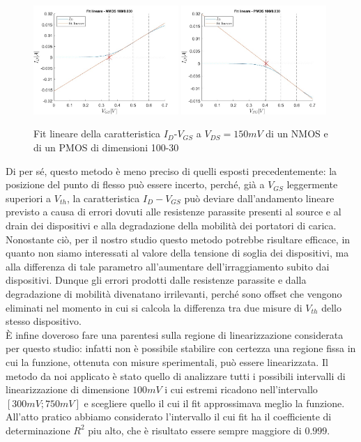 \documentclass[12pt, letterpaper]{book}
\begin{document}
\begin{figure}[h!]
  \centering
  \includegraphics[width=0.49\textwidth]{LinearFit-N4-100-30}
  \includegraphics[width=0.49\textwidth]{LinearFit-P1-100-30}
  \caption{Fit lineare della caratteristica  $I_D$-$V_{GS}$ a $V_{DS}=150mV$ di un NMOS e di un PMOS di dimensioni 100-30 }
\end{figure}

Di per sé, questo metodo è meno preciso di quelli esposti precedentemente: la posizione del punto di flesso può essere incerto, perché, già a $V_{GS}$ leggermente superiori a $V_{th}$, la caratteristica $I_D-V_{GS}$ può deviare dall'andamento lineare previsto a causa di errori dovuti alle resistenze parassite presenti al source e al drain dei dispositivi e alla degradazione della mobilità dei portatori di carica.
Nonostante ciò, per il nostro studio questo metodo potrebbe risultare efficace, in quanto non siamo interessati al valore della tensione di soglia dei dispositivi, ma alla differenza di tale parametro all'aumentare dell'irraggiamento subito dai dispositivi. Dunque gli errori prodotti dalle resistenze parassite e dalla degradazione di mobilità divenatano irrilevanti, perché sono offset che vengono eliminati nel momento in cui si calcola la differenza tra due misure di $V_{th}$ dello stesso dispositivo.\\
È infine doveroso fare una parentesi sulla regione di linearizzazione considerata per questo studio: infatti non è possibile stabilire con certezza una regione fissa in cui la funzione, ottenuta con misure sperimentali, può essere linearizzata. Il metodo da noi applicato è stato quello di analizzare tutti i possibili intervalli di linearizzazione di dimensione $100 mV$ i cui estremi ricadono nell'intervallo $[300 mV ; 750mV]$ e scegliere quello il cui il fit approssimava meglio la funzione. All'atto pratico abbiamo considerato l'intervallo il cui fit ha il coefficiente di determinazione $R^2$ piu alto, che è risultato essere sempre maggiore di $0.999$.
\end{document}
